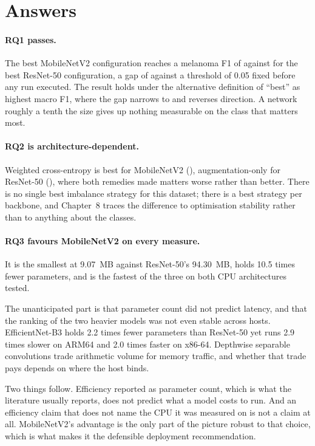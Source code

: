 \section{Answers}
\label{sec:conc-answers}

\paragraph{RQ1 passes.} The best MobileNetV2 configuration reaches a melanoma F1 of
\RQoneFoneMobile{} against \RQoneFoneResnet{} for the best ResNet-50 configuration, a gap
of \RQoneGap{} against a threshold of 0.05 fixed before any run executed. The result
holds under the alternative definition of ``best'' as highest macro F1, where the gap
narrows to \RQoneAltGap{} and reverses direction. A network roughly a tenth the size
gives up nothing measurable on the class that matters most.

\paragraph{RQ2 is architecture-dependent.} Weighted cross-entropy is best for
MobileNetV2 (\RQtwoBestMobile), augmentation-only for ResNet-50 (\RQtwoBestResnet),
where both remedies made matters worse rather than better.
There is no single best imbalance strategy for this dataset; there is a best strategy per
backbone, and Chapter~8 traces the difference to optimisation stability rather than to
anything about the classes.

\paragraph{RQ3 favours MobileNetV2 on every measure.} It is the smallest at 9.07~MB
against ResNet-50's 94.30~MB, holds 10.5 times fewer parameters, and is the fastest of the
three on both CPU architectures tested.

The unanticipated part is that parameter count did not predict latency, and that the
ranking of the two heavier models was not even stable across hosts. EfficientNet-B3 holds
2.2 times fewer parameters than ResNet-50 yet runs 2.9 times slower on ARM64 and 2.0 times
faster on x86-64. Depthwise separable convolutions trade arithmetic volume for memory
traffic, and whether that trade pays depends on where the host binds.

Two things follow. Efficiency reported as parameter count, which is what the literature
usually reports, does not predict what a model costs to run. And an efficiency claim that
does not name the CPU it was measured on is not a claim at all. MobileNetV2's advantage
is the only part of the picture robust to that choice, which is what makes it the
defensible deployment recommendation.

